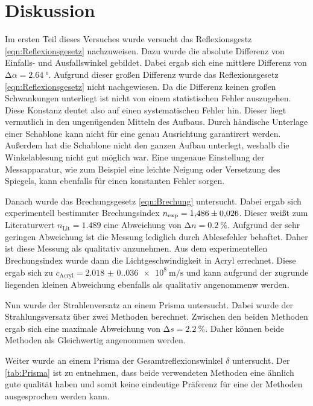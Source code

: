 \section{Diskussion}
\label{sec:Diskussion}
Im ersten Teil dieses Versuches wurde versucht das Reflexionsgestz \eqref{eqn:Reflexionsgesetz} nachzuweisen. Dazu wurde die absolute Differenz von Einfalls- und 
Ausfallswinkel gebildet. Dabei ergab sich eine mittlere Differenz von $\mathrm{\Delta}\alpha = \qty{2.64}{\degree}$. Aufgrund dieser großen Differenz wurde das 
Reflexionsgesetz \eqref{eqn:Reflexionsgesetz} nicht nachgewiesen. Da die Differenz keinen großen Schwankungen unterliegt ist nicht von einem statistischen Fehler auszugehen.
Diese Konstanz deutet also auf einen systematischen Fehler hin. Dieser liegt vermutlich in den ungenügenden Mitteln des Aufbaus. Durch händische Unterlage einer Schablone kann 
nicht für eine genau Ausrichtung garantirert werden. Außerdem hat die Schablone nicht den ganzen Aufbau unterlegt, weshalb die Winkelablesung nicht gut möglich war. Eine 
ungenaue Einstellung der Messapparatur, wie zum Beispiel eine leichte Neigung oder Versetzung des Spiegels, kann ebenfalls für einen konstanten Fehler sorgen. 

Danach wurde das Brechungsgesetz \eqref{eqn:Brechung} untersucht. Dabei ergab sich experimentell bestimmter Brechungsindex $n_{\text{exp}} = \num{1.486 +- 0.026}$. Dieser
weißt zum Literaturwert $n_{\text{Lit}} = \num{1.489}$ eine Abweichung von $\mathrm{\Delta}n = \qty{0.2}{\percent}$. Aufgrund der sehr geringen Abweichung ist die Messung 
lediglich durch Ablesefehler behaftet. Daher ist diese Messung als qualitativ anzunehmen. Aus dem experimentellen Brechungsindex wurde dann die Lichtgeschwindigkeit in 
Acryl errechnet. Diese ergab sich zu $c_{\text{Acryl}} = \qty{2.018(0.036)e8}{\metre\per\second}$ und kann aufgrund der zugrunde liegenden kleinen Abweichung ebenfalls als 
qualitativ angenommenw werden. 

Nun wurde der Strahlenversatz an einem Prisma untersucht. Dabei wurde der Strahlungsversatz über zwei Methoden berechnet. Zwischen den beiden Methoden ergab sich eine 
maximale Abweichung von $\mathrm{\Delta}s = \qty{2.2}{\percent}$. Daher können beide Methoden als Gleichwertig angenommen werden.

Weiter wurde an einem Prisma der Gesamtreflexionswinkel $\delta$ untersucht. Der \autoref{tab:Prisma} ist zu entnehmen, dass beide verwendeten Methoden eine ähnlich gute 
qualität haben und somit keine eindeutige Präferenz für eine der Methoden ausgesprochen werden kann. 

